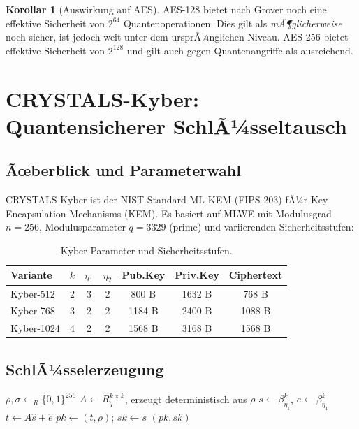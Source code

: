 ﻿\documentclass[a4paper,12pt]{article}
\theoremstyle{definition}
\newtheorem{korollar}{Korollar}[section]
\begin{document}
\begin{korollar}[Auswirkung auf AES]
AES-128 bietet nach Grover noch eine effektive Sicherheit von $2^{64}$ Quantenoperationen.
Dies gilt als \emph{mÃ¶glicherweise} noch sicher, ist jedoch weit unter dem
ursprÃ¼nglichen Niveau. AES-256 bietet effektive Sicherheit von $2^{128}$
und gilt auch gegen Quantenangriffe als ausreichend.
\end{korollar}

\section{CRYSTALS-Kyber: Quantensicherer SchlÃ¼sseltausch}

\subsection{Ãœberblick und Parameterwahl}

CRYSTALS-Kyber \cite{ABD+22} ist der NIST-Standard ML-KEM (FIPS 203) fÃ¼r
Key Encapsulation Mechanisms (KEM). Es basiert auf MLWE mit Modulusgrad $n = 256$,
Modulusparameter $q = 3329$ (prime) und variierenden Sicherheitsstufen:

\begin{table}[H]
\centering
\caption{Kyber-Parameter und Sicherheitsstufen.}
\label{tab:kyber}
\begin{tabular}{lcccccc}
\toprule
Variante & $k$ & $\eta_1$ & $\eta_2$ & Pub.Key & Priv.Key & Ciphertext\\
\midrule
Kyber-512  & 2 & 3 & 2 & 800 B & 1632 B & 768 B \\
Kyber-768  & 3 & 2 & 2 & 1184 B & 2400 B & 1088 B \\
Kyber-1024 & 4 & 2 & 2 & 1568 B & 3168 B & 1568 B \\
\bottomrule
\end{tabular}
\end{table}

\subsection{SchlÃ¼sselerzeugung}

\begin{algorithm}[H]
\caption{Kyber.KeyGen()}
\label{alg:kyberkeygen}
\begin{algorithmic}[1]
\State $\rho, \sigma \leftarrow_R \{0,1\}^{256}$
\State $A \leftarrow R_q^{k \times k}$, erzeugt deterministisch aus $\rho$
\State $s \leftarrow \beta_{\eta_1}^k$, $e \leftarrow \beta_{\eta_1}^k$
\State $t \leftarrow A \hat{s} + \hat{e}$
\State $pk \leftarrow (t, \rho)$; $sk \leftarrow s$
\State \Return $(pk, sk)$
\end{algorithmic}
\end{algorithm}
\end{document}
